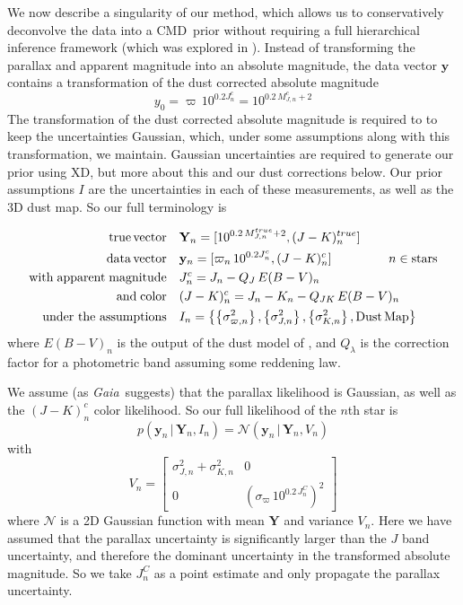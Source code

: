 \documentclass[modern]{aastex61}
\newcommand{\acronym}[1]{{\small{#1}}}
\newcommand{\project}[1]{\textsl{#1}}
\newcommand{\gaia}{\project{Gaia}}
\newcommand{\xd}{\acronym{XD}}
\newcommand{\cmd}{\acronym{CMD}}
\newcommand{\given}{\,|\,}
\begin{document}
{We now describe a singularity of our method, which allows us to conservatively deconvolve the data into a \cmd\ prior without requiring a full hierarchical inference framework (which was explored in \citealt{leistedtHogg2017}).
Instead of transforming the parallax and apparent magnitude into an absolute magnitude, the data vector $\mathbf{y}$ contains a transformation of the dust corrected absolute magnitude
\begin{equation}
y_0 = \varpi\,10^{0.2J^c_n} = 10^{0.2\,M^c_{J,n} + 2}
\label{eq:transform}
\end{equation}
The transformation of the dust corrected absolute magnitude is required to to keep the uncertainties Gaussian, which, under some assumptions along with this transformation, we maintain. Gaussian uncertainties are required to generate our prior using \xd, but more about this and our dust corrections below.
Our prior assumptions $I$ are the uncertainties in each of these measurements, as well as the 3D dust map. So our full terminology is

\begin{equation}
\begin{aligned}
\mathrm{true \, vector} \quad &\mathbf{Y}_n = [10^{0.2\,M^{true}_{J,n} + 2}, (J-K)^{true}_n] \\
\mathrm{data \, vector} \quad &\mathbf{y}_n = [\varpi_n\,10^{0.2J^c_n}, (J- K)^c_n] \;\hspace*{15mm}  n \in \mathrm{stars} \\
\mathrm{with \; apparent \; magnitude} \quad &J^c_n = J_n - Q_J\,E(B-V)_n \\
\mathrm{and \; color} \quad &(J - K)^c_n = J_n - K_n - Q_{JK}\,E(B-V)_n \\
\mathrm{under\ the\ assumptions} \quad &I_n = \left\{\left\{\sigma^2_{\varpi, n}\right\}, \left\{\sigma^2_{J,n}\right\}, \left\{\sigma^2_{K,n}\right\}, \mathrm{Dust \, Map}\right\}
\end{aligned}
\label{eq:data}
\end{equation}
where $E(B-V)_n$ is the output of the dust model of \cite{green15}, and $Q_{\lambda}$ is the correction factor for a photometric band assuming some reddening law.

We assume (as \gaia\ suggests) that the parallax likelihood is Gaussian, as well as the $(J-K)^c_n$ color likelihood. So our full likelihood of the $n$th star is
\begin{equation}
p(\mathbf{y}_n \given \mathbf{Y}_n, I_n) = \mathcal{N}(\mathbf{y}_n \given \mathbf{Y}_n, V_n)
\end{equation}
with \\
\[
V_n = \begin{bmatrix}
\sigma_{J,n}^2 + \sigma_{K,n}^2 & 0 \\
0 & (\sigma_{\varpi}\,10^{0.2\,J_n^C})^2
\end{bmatrix}
\]
where $\mathcal{N}$ is a 2D Gaussian function with mean $\mathbf{Y}$ and variance $V_n$.
Here we have assumed that the parallax uncertainty is significantly larger than the $J$ band uncertainty, and therefore the dominant uncertainty in the transformed absolute magnitude. So we take $J_n^C$ as a point estimate and only propagate the parallax uncertainty.

}
\end{document}
